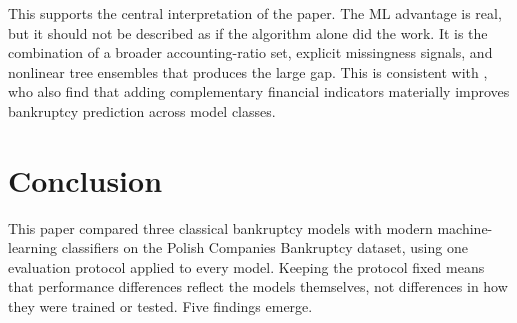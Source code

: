 \documentclass[12pt,a4paper]{article}
\begin{document}
\begin{table}[H]
\centering
\caption{A simple decomposition of the H1 performance gap. Positive numbers
are improvements in AUC or PR-AUC between the two models in the comparison.}
\label{tab:feature-decomp}
\small
{}
\caption*{\footnotesize Source: author's calculations (code in Annex 1).}
\end{table}

This supports the central interpretation of the paper. The ML advantage is
real, but it should not be described as if the algorithm alone did the work.
It is the combination of a broader accounting-ratio set, explicit missingness
signals, and nonlinear tree ensembles that produces the large gap. This is
consistent with \cite{barboza2017}, who also find that adding complementary
financial indicators materially improves bankruptcy prediction across model
classes.


\clearpage
\section{Conclusion}\label{sec:conclusion}

This paper compared three classical bankruptcy models with modern
machine-learning classifiers on the Polish Companies Bankruptcy dataset,
using one evaluation protocol applied to every model. Keeping the protocol
fixed means that performance differences reflect the models themselves,
not differences in how they were trained or tested. Five findings emerge.
\end{document}
